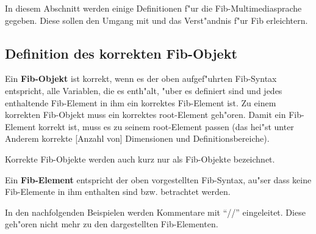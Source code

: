 In diesem Abschnitt werden einige Definitionen f"ur die Fib-Multimediasprache gegeben. Diese sollen den Umgang mit und das Verst"andnis f"ur Fib erleichtern.

\subsection{Definition des korrekten Fib-Objekt}

Ein \textbf{Fib-Objekt} ist korrekt, wenn es der oben aufgef"uhrten Fib-Syntax entspricht, alle Variablen, die es enth"alt, "uber es definiert sind und jedes enthaltende Fib-Element in ihm ein korrektes Fib-Element ist. Zu einem korrekten Fib-Objekt muss ein korrektes root-Element geh"oren. Damit ein Fib-Element korrekt ist, muss es zu seinem root-Element passen (das hei"st unter Anderem korrekte [Anzahl von] Dimensionen und Definitionsbereiche).

Korrekte Fib-Objekte werden auch kurz nur als Fib-Objekte bezeichnet.

\bigskip\noindent
Ein \textbf{Fib-Element} entspricht der oben vorgestellten Fib-Syntax, au"ser dass keine Fib-Elemente in ihm enthalten sind bzw. betrachtet werden.

\bigskip\noindent
In den nachfolgenden Beispielen werden Kommentare mit ``//'' eingeleitet. Diese geh"oren nicht mehr zu den dargestellten Fib-Elementen.


